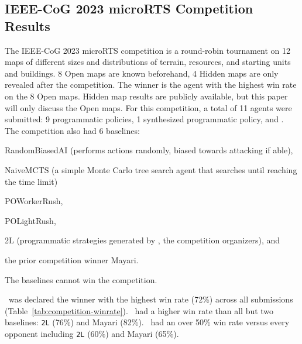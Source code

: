 \documentclass[conference]{IEEEtran}
\begin{document}
\subsection{IEEE-CoG 2023 microRTS Competition Results}
The IEEE-CoG 2023 microRTS competition is a round-robin tournament on 12 maps of
different sizes and distributions of terrain, resources, and starting units and
buildings. 8 Open maps are known beforehand, 4 Hidden maps are only revealed after the
competition. The winner is the agent with the highest win rate on the 8 Open maps.
Hidden map results are publicly available, but this paper will only discuss
the Open maps. For
this competition, a total of 11 agents were submitted: 9 programmatic policies, 1
synthesized programmatic policy, and \agentName. The competition also had 6
baselines:
\begin{inparaenum}[(1)]
    \item RandomBiasedAI (performs actions randomly, biased towards attacking if able),
    \item NaiveMCTS (a simple Monte Carlo tree search agent that searches until reaching
    the time limit)
    \item POWorkerRush,
    \item POLightRush,
    \item 2L (programmatic strategies generated by \cite{DBLP:conf/ijcai/MoraesAFL23}, the
    competition organizers), and
    \item the prior competition winner Mayari.
\end{inparaenum}
The baselines cannot win the competition.

\agentName\ was declared the winner with the highest win rate (72\%) across all
submissions (Table~\ref{tab:competition-winrate}). \agentName\ had a higher win rate 
than all but two baselines: \texttt{2L} (76\%) and Mayari (82\%). \agentName\ had an 
over 50\% win rate versus every opponent including \texttt{2L} (60\%) and Mayari (65\%).
\end{document}
